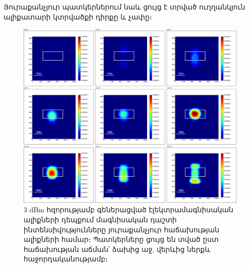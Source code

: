 \documentclass[12pt, fleqn]{report}
\begin{document}
Յուրաքանչյուր պատկերներում նաև ցույց է տրված ուղղանկյուն ալիքատարի կտրվածքի դիրքը և չափը։
\begin{figure}
    \begin{adjustwidth}{-1.5cm}{}
    \centering
     \includegraphics[width=1.0\textwidth]{data/experiment-results/free field of antenna, 6-14ghz, 3dbm generator output, distance 5mm.png}
    \caption{3 dBm հզորությամբ գեներացված էլեկտրամագնիսական ալիքների դեպքում մագնիսական դաշտի ինտենսիվությունները յուրաքանչյուր հաճախության ալիքների համար։ Պատկերները ցույց են տված ըստ հաճախության աճման՝ ձախից աջ, վերևից ներքև հաջորդականությամբ։}
    \label{fig:3dBm-diagram}
\end{adjustwidth}
\end{figure}
\end{document}
